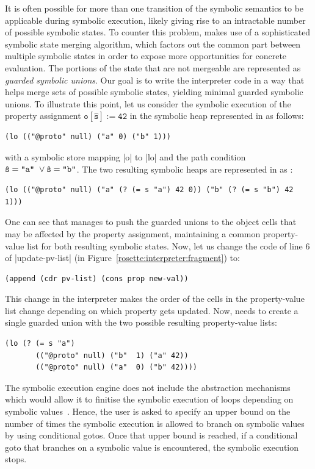 It is often possible for more than one transition of the symbolic 
semantics to be applicable during symbolic execution, likely 
giving rise to an intractable number of possible symbolic states. 
To counter this problem, \rosette makes use of a sophisticated 
symbolic state merging algorithm, which factors out the common 
part between multiple symbolic states  in order to expose more 
opportunities for concrete evaluation. The portions of the state 
that are not mergeable are represented as \emph{guarded symbolic unions}. 
Our goal is to write the interpreter code in a way that helps 
\rosette merge sets of possible symbolic states, yielding minimal 
guarded symbolic unions.
To illustrate this point, let us consider the symbolic execution 
of the property assignment $\mathtt{o[\hat{s}] := 42}$ in the 
symbolic heap represented in \rosette as follows: 
%
\begin{lstlisting}
(lo (("@proto" null) ("a" 0) ("b" 1)))
\end{lstlisting}
%
with a symbolic store mapping \schemeinline|o| to \schemeinline|lo| and 
the path condition {\small $\mathtt{\hat{s} = \text{\texttt{"a"}} \ \vee \hat{s} = \text{\texttt{"b"}}}$}.
The two resulting symbolic heaps are represented in \rosette as :  
%
\begin{lstlisting}
(lo (("@proto" null) ("a" (? (= s "a") 42 0)) ("b" (? (= s "b") 42 1)))
\end{lstlisting}
%
One can see that \rosette manages to push the guarded unions to 
the object cells that may be affected by the property assignment, maintaining a common 
property-value list for both resulting symbolic states. 
%
Now, let us change the code of line 6 of \schemeinline|update-pv-list| 
(in Figure~\ref{rosette:interpreter:fragment}) to:  
\begin{lstlisting}
(append (cdr pv-list) (cons prop new-val))
\end{lstlisting}
This change in the interpreter makes the order of the cells in the property-value 
list change depending on which property gets updated. 
Now, \rosette needs to create a single guarded union 
with the two possible resulting property-value lists: 
\begin{lstlisting}
(lo (? (= s "a") 
       (("@proto" null) ("b"  1) ("a" 42)) 
       (("@proto" null) ("a"  0) ("b" 42))))
\end{lstlisting}

 The \jsil symbolic execution engine does not 
include the abstraction mechanisms which would allow it to finitise the symbolic 
execution of loops depending on symbolic values~\cite{abstract:symbolic:exec}. 
Hence, the user is asked to specify an upper bound on the number of times
the symbolic execution is allowed to branch on symbolic values by using
conditional gotos. 
Once that upper bound is reached, if a conditional goto that branches 
on a symbolic value is encountered, the symbolic execution stops.  


